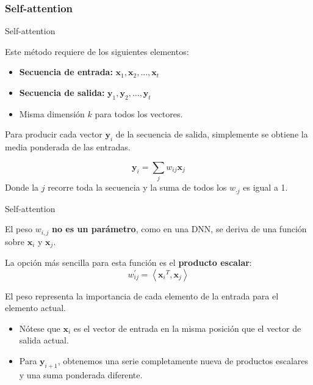 \documentclass[aspectratio=169]{beamer}
\begin{document}
\subsubsection{Self-attention}

\begin{frame}{Self-attention}

  Este método requiere de los siguientes elementos:
  \begin{itemize}
    \item \textbf{Secuencia de entrada:} $ \mathbf{x}_{1}, \mathbf{x}_{2}, \ldots, \mathbf{x}_{t} $
    \item \textbf{Secuencia de salida:} $ \mathbf{y}_{1}, \mathbf{y}_{2}, \ldots, \mathbf{y}_{t} $
    \item Misma dimensión $ k $ para todos los vectores.
  \end{itemize}

  \vspace{.3cm}

  \begin{block}{}
    Para producir cada vector $ \mathbf{y}_i $ de la secuencia de salida, simplemente se obtiene la media ponderada de las entradas.
  \end{block}

  \begin{equation*}
    \mathbf{y}_{i} = \sum_{j} w_{ij} \mathbf{x}_{j}     
  \end{equation*}
  Donde la $j$ recorre toda la secuencia y la suma de todos los $w_{\cdot j}$ es igual a 1. 
\end{frame}

\begin{frame}{Self-attention}
  \begin{block}{}
    El peso $ w_{i, j} $ \textbf{no es un parámetro}, como en una DNN, se deriva de una función sobre $ \mathbf{x}_{i} $ y $ \mathbf{x}_{j} $.
  \end{block}
  \vspace{.3cm}

  La opción más sencilla para esta función es el \textbf{producto escalar}:
  \begin{equation*}
    w^{'}_{ij} = \left \langle {\mathbf{x}_{i}}^{T}, \mathbf{x}_{j} \right \rangle
  \end{equation*}

  \begin{block}{}
    El peso representa la importancia de cada elemento de la entrada para el elemento actual. 
  \end{block}
  \vspace{.3cm}

  \begin{itemize}
    \item Nótese que $ \mathbf{x}_{i} $ es el vector de entrada en la misma posición que el vector de salida actual.
    \item Para $ \mathbf{y}_{i+1} $, obtenemos una serie completamente nueva de productos escalares y una suma ponderada diferente.
  \end{itemize}

\end{frame}
\end{document}
